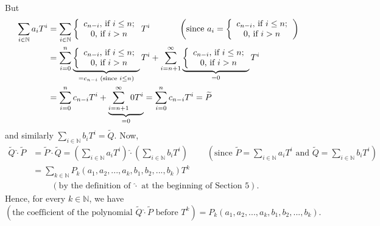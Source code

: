 \documentclass[numbers=enddot,12pt,final,onecolumn,notitlepage]{scrartcl}%
\begin{document}
But%
\begin{align*}
\sum\limits_{i\in\mathbb{N}}a_{i}T^{i}  &  =\sum\limits_{i\in\mathbb{N}%
}\left\{
\begin{array}
[c]{c}%
c_{n-i}\text{, if }i\leq n;\\
0\text{, if }i>n
\end{array}
\right.  T^{i}\ \ \ \ \ \ \ \ \ \ \left(  \text{since }a_{i}=\left\{
\begin{array}
[c]{c}%
c_{n-i}\text{, if }i\leq n;\\
0\text{, if }i>n
\end{array}
\right.  \right) \\
&  =\sum\limits_{i=0}^{n}\underbrace{\left\{
\begin{array}
[c]{c}%
c_{n-i}\text{, if }i\leq n;\\
0\text{, if }i>n
\end{array}
\right.  }_{=c_{n-i}\text{ (since }i\leq n\text{)}}T^{i}+\sum\limits_{i=n+1}%
^{\infty}\underbrace{\left\{
\begin{array}
[c]{c}%
c_{n-i}\text{, if }i\leq n;\\
0\text{, if }i>n
\end{array}
\right.  }_{=0}T^{i}\\
&  =\sum\limits_{i=0}^{n}c_{n-i}T^{i}+\underbrace{\sum\limits_{i=n+1}^{\infty
}0T^{i}}_{=0}=\sum\limits_{i=0}^{n}c_{n-i}T^{i}=\widetilde{P}%
\end{align*}
and similarly $\sum\limits_{i\in\mathbb{N}}b_{i}T^{i}=\widetilde{Q}$. Now,%
\begin{align*}
\widetilde{Q}\widehat{\cdot}\widetilde{P}  &  =\widetilde{P}\widehat{\cdot
}\widetilde{Q}=\left(  \sum\limits_{i\in\mathbb{N}}a_{i}T^{i}\right)
\widehat{\cdot}\left(  \sum\limits_{i\in\mathbb{N}}b_{i}T^{i}\right)
\ \ \ \ \ \ \ \ \ \ \left(  \text{since }\widetilde{P}=\sum\limits_{i\in
\mathbb{N}}a_{i}T^{i}\text{ and }\widetilde{Q}=\sum\limits_{i\in\mathbb{N}%
}b_{i}T^{i}\right) \\
&  =\sum_{k\in\mathbb{N}}P_{k}\left(  a_{1},a_{2},...,a_{k},b_{1}%
,b_{2},...,b_{k}\right)  T^{k}\\
&  \ \ \ \ \ \ \ \ \ \ \left(  \text{by the definition of }\widehat{\cdot
}\text{ at the beginning of Section 5}\right)  .
\end{align*}
Hence, for every $k\in\mathbb{N}$, we have%
\[
\left(  \text{the coefficient of the polynomial }\widetilde{Q}\widehat{\cdot
}\widetilde{P}\text{ before }T^{k}\right)  =P_{k}\left(  a_{1},a_{2}%
,...,a_{k},b_{1},b_{2},...,b_{k}\right)  .
\]
\end{document}
